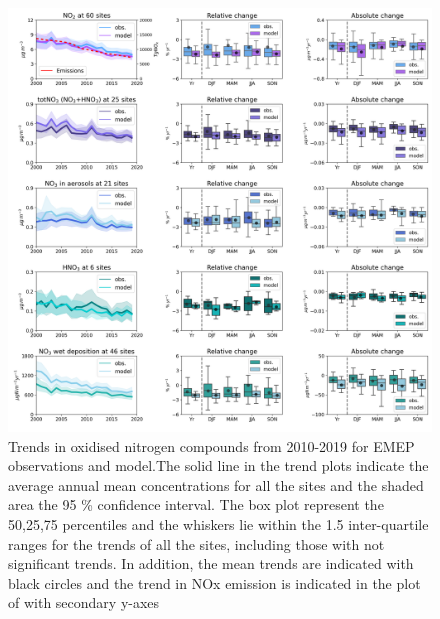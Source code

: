 \begin{figure}
	\centering
	\includegraphics[width=0.74\paperwidth]{FIGS_TRENDS/Nox_trends.png}
	\caption{\label{fig:NOx_trends}Trends in oxidised nitrogen compounds from 2010-2019 for EMEP observations and model.The solid line in the trend plots indicate the average annual mean concentrations for all the sites and the shaded area the 95 \% confidence interval. The box plot represent the 50,25,75 percentiles and the whiskers lie within the 1.5 inter-quartile ranges for the trends of all the sites, including those with not significant trends. In addition, the mean trends are indicated with black circles and the trend in NOx emission is indicated in the plot of \noii with secondary y-axes}
\end{figure}


